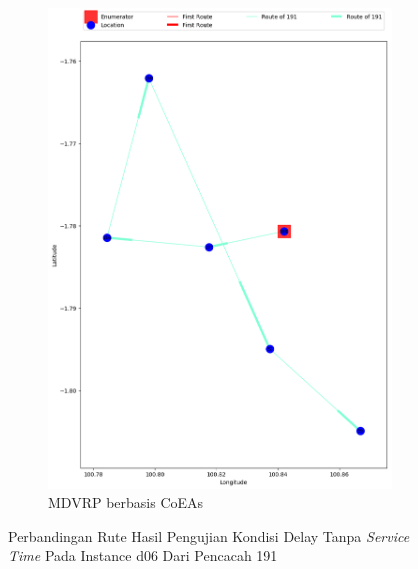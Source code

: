 \begin{figure}[H]
	\centering
	\begin{subfigure}[t]{\textwidth}
		\centering
		\includegraphics[width=\textwidth]{Resources/Images/delayed_6/real_m15_n100_delayed_6_191_coes}
		\caption{MDVRP berbasis CoEAs}
		\label{fig:real_m15_n100_delayed_6_191_coes}
	\end{subfigure}
	\caption{Perbandingan Rute Hasil Pengujian Kondisi Delay Tanpa \textit{Service Time} Pada Instance d06 Dari Pencacah 191}
	\label{fig:real_m15_n100_delayed_6_191}
\end{figure}


